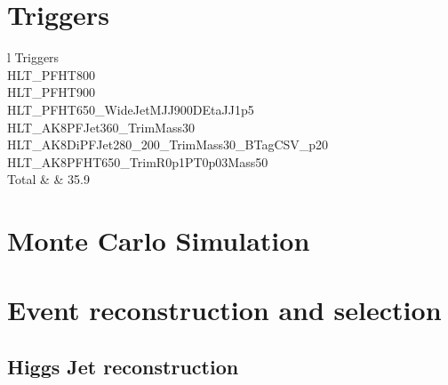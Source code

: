 \section{Triggers} \label{Triggers}

\begin{table}[h!]
  \begin{center}
    \begin{tabular}{l}
    Triggers \\
    \hline
    HLT_PFHT800 \\
    HLT_PFHT900 \\
    HLT_PFHT650_WideJetMJJ900DEtaJJ1p5 \\
    HLT_AK8PFJet360_TrimMass30 \\
    HLT_AK8DiPFJet280_200_TrimMass30_BTagCSV_p20 \\
    HLT_AK8PFHT650_TrimR0p1PT0p03Mass50 \\
    \hline
    Total & & 35.9 \\
    \end{tabular}
  \end{center}

  \caption{List of Triggers applied in the analysis.}
\end{table} 

\section{Monte Carlo Simulation} \label{Monte Carlo Simulation}	

\section{Event reconstruction and selection} \label{Event reconstruction and selection}

\subsection{Higgs Jet reconstruction} 
	